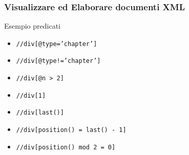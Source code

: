 \begin{frame}
    \frametitle{Visualizzare ed Elaborare documenti XML}
    \addtocounter{nframe}{1}
    

    \begin{block}{Esempio predicati}
        \begin{itemize}
            \item \texttt{//div[@type='chapter']}
            \item \texttt{//div[@type!='chapter']}
            \item \texttt{//div[@n > 2]}
            \item \texttt{//div[1]}
            \item \texttt{//div[last()]}
            \item \texttt{//div[position() = last() - 1]}
            \item \texttt{//div[position() mod 2 = 0]}
        \end{itemize}
    \end{block}

\end{frame}

